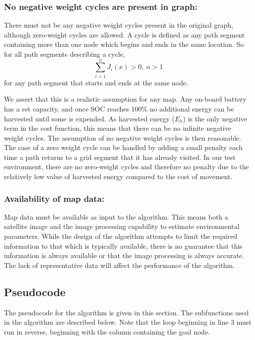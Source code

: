 \documentclass[journal]{IEEEtran}
\newcounter{col}
\begin{document}
\subsubsection{No negative weight cycles are present in graph:}
There must not be any negative weight cycles present in the original graph, although zero-weight cycles are allowed. A cycle is defined as any path segment containing more than one node which begins and ends in the same location.  So for all path segments describing a cycle, 
\begin{equation}
\sum_{i=1}^n J_i(x) > 0,\ n>1
\end{equation}
for any path segment that starts and ends at the same node.

We assert that this is a realistic assumption for any map. Any on-board battery has a set capacity, and once SOC reaches 100\% no additional energy can be harvested until some is expended. 
As harvested energy ($E_h$) is the only negative term in the cost function, this means that there can be no infinite negative weight cycles. 
The assumption of no negative weight cycles is then reasonable. 
The case of a zero weight cycle can be handled by adding a small penalty each time a path returns to a grid segment that it has already visited.
In our test environment, there are no zero-weight cycles and therefore no penalty due to the relatively low value of harvested energy compared to the cost of movement.

\subsubsection{Availability of map data:}
Map data must be available as input to the algorithm. 
This means both a satellite image and the image processing capability to estimate environmental parameters. 
While the design of the algorithm attempts to limit the required information to that which is typically available, there is no guarantee that this information is always available or that the image processing is always accurate. The lack of representative data will affect the performance of the algorithm.

\subsection{Pseudocode}
The pseudocode for the algorithm is given in this section. The subfunctions used in the algorithm are described below. 
Note that the loop beginning in line 3 must run in reverse, beginning with the column containing the goal node.
\end{document}
